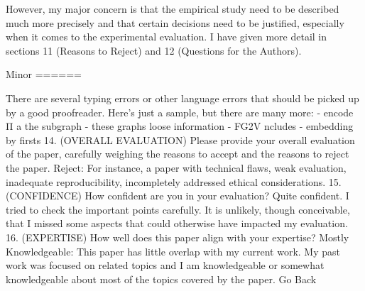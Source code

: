 However, my major concern is that the empirical study need to be described much more precisely and that certain decisions need to be justified, especially when it comes to the experimental evaluation. I have given more detail in sections 11 (Reasons to Reject) and 12 (Questions for the Authors).


Minor
======

There are several typing errors or other language errors that should be picked up by a good proofreader. Here's just a sample, but there are many more:
- encode Π a the subgraph
- these graphs loose information
- FG2V ncludes
- embedding by firsts
14. (OVERALL EVALUATION) Please provide your overall evaluation of the paper, carefully weighing the reasons to accept and the reasons to reject the paper.
Reject: For instance, a paper with technical flaws, weak evaluation, inadequate reproducibility, incompletely addressed ethical considerations.
15. (CONFIDENCE) How confident are you in your evaluation?
Quite confident. I tried to check the important points carefully. It is unlikely, though conceivable, that I missed some aspects that could otherwise have impacted my evaluation.
16. (EXPERTISE) How well does this paper align with your expertise?
Mostly Knowledgeable: This paper has little overlap with my current work. My past work was focused on related topics and I am knowledgeable or somewhat knowledgeable about most of the topics covered by the paper.
Go Back